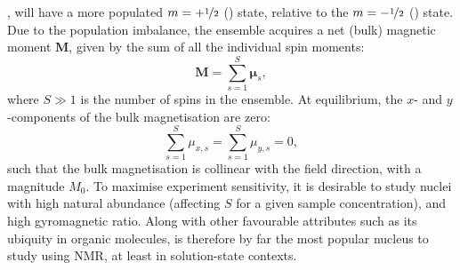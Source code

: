 , will have a more populated $m = +\nicefrac{1}{2}$ (\textalpha) state,
relative to the $m = -\nicefrac{1}{2}$ (\textbeta) state.  Due to the
population imbalance, the ensemble acquires a net (bulk) magnetic moment
$\symbf{M}$, given by the sum of all the individual spin moments:
\begin{equation}
    \symbf{M} = \sum\limits_{s=1}^{S} \symbf{\mu}_s,
\end{equation}
where $S \gg 1$ is the number of spins in the ensemble.
At equilibrium, the $x$- and $y$-components of the bulk magnetisation are zero:
\begin{equation}
    \sum_{s=1}^{S} \mu_{x,s} = \sum_{s=1}^{S} \mu_{y,s} = 0,
\end{equation}
such that the bulk magnetisation is collinear with the field direction, with a
magnitude $M_0$.
\label{corr:high-temp}
To maximise experiment sensitivity, it is desirable to
study nuclei with high natural abundance (affecting $S$ for a given sample
concentration), and high
gyromagnetic ratio. Along with other favourable attributes such as its ubiquity
in organic molecules,  is therefore by far the most popular nucleus to
study using \ac{NMR}, at least in solution-state contexts.

